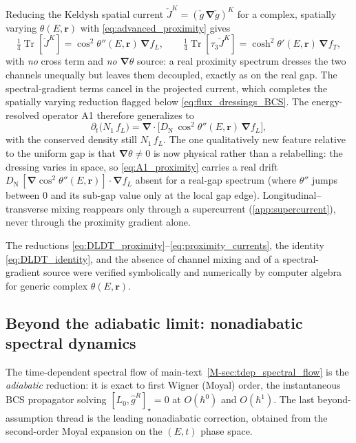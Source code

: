 \documentclass[
  aps,
  prb,
  preprint,
  superscriptaddress,
  longbibliography,
  nofootinbib
]{revtex4-2}
\newcommand{\Tr}{\operatorname{Tr}}
\newcommand{\br}{\mathbf{r}}
\newcommand{\bnabla}{\boldsymbol{\nabla}}
\newcommand{\DOS}{N_1}
\newcommand{\DN}{D_{\mathrm{N}}}
\newcommand{\fL}{f_L}
\newcommand{\fT}{f_T}
\newcommand{\hatg}{\hat{g}}
\newcommand{\checkg}{\check{g}}
\begin{document}
Reducing the Keldysh spatial current \(\check J^{K}=(\checkg\,\bnabla\checkg)^{K}\)
for a complex, spatially varying \(\theta(E,\br)\) with
\cref{eq:advanced_proximity} gives
\begin{equation}
  \tfrac14\Tr[\check J^{K}]=\cos^{2}\!\theta''(E,\br)\,\bnabla\fL,
  \qquad
  \tfrac14\Tr[\tau_3\check J^{K}]=\cosh^{2}\!\theta'(E,\br)\,\bnabla\fT,
  \label{eq:proximity_currents}
\end{equation}
with \emph{no} cross term and \emph{no} \(\bnabla\theta\) source: a real proximity
spectrum dresses the two channels unequally but leaves them decoupled, exactly as on
the real gap. The spectral-gradient terms cancel in the projected current, which
completes the spatially varying reduction flagged below \cref{eq:flux_dressings_BCS}.
The energy-resolved operator A1 therefore generalizes to
\begin{equation}
  \partial_t\!\big(\DOS\,\fL\big)
    =\bnabla\!\cdot\!\Big[\DN\,\cos^{2}\!\theta''(E,\br)\,\bnabla\fL\Big],
  \label{eq:A1_proximity}
\end{equation}
with the conserved density still \(\DOS\,\fL\). The one qualitatively new feature
relative to the uniform gap is that \(\bnabla\theta\neq0\) is now physical rather
than a relabelling: the dressing varies in space, so \cref{eq:A1_proximity} carries a
real drift \(\DN\,[\bnabla\cos^{2}\theta''(E,\br)]\!\cdot\!\bnabla\fL\) absent for a
real-gap spectrum (where \(\theta''\) jumps between \(0\) and its sub-gap
value only at the local gap edge). Longitudinal--transverse mixing reappears only through a
supercurrent (\cref{app:supercurrent}), never through the proximity gradient alone.

The reductions \cref{eq:DLDT_proximity}--\cref{eq:proximity_currents}, the identity
\cref{eq:DLDT_identity}, and the absence of channel mixing and of a
spectral-gradient source were verified symbolically and numerically by computer
algebra for generic complex \(\theta(E,\br)\).


\subsection{Beyond the adiabatic limit: nonadiabatic spectral dynamics}
\label{app:nonadiabatic}

The time-dependent spectral flow of main-text~\cref{M-sec:tdep_spectral_flow} is the
\emph{adiabatic} reduction: it is exact to first Wigner (Moyal) order, the
instantaneous BCS propagator solving \([L_0,\hatg^R]_\star=0\) at
\(O(\hbar^0)\) and \(O(\hbar^1)\). The last beyond-assumption thread is the
leading nonadiabatic correction, obtained from the second-order Moyal
expansion on the \((E,t)\) phase space.
\end{document}

